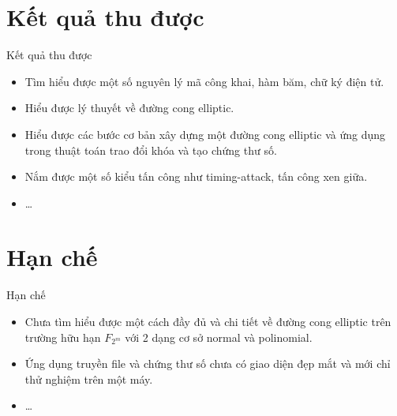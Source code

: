 \documentclass[compress]{beamer}
\begin{document}
\section*{Kết quả thu được}
\begin{frame}{Kết quả thu được}
\begin{itemize}
\item Tìm hiểu được một số nguyên lý mã công khai, hàm băm, chữ ký điện tử.
\item Hiểu được lý thuyết về đường cong elliptic.
\item Hiểu được các bước cơ bản xây dựng một đường cong elliptic và ứng dụng trong thuật toán trao đổi khóa và tạo chứng thư số.
\item Nắm được một số kiểu tấn công như timing-attack, tấn công xen giữa.
\item \ldots
\end{itemize}
\end{frame}
\section*{Hạn chế}
\begin{frame}{Hạn chế}
\begin{itemize}
\item Chưa tìm hiểu được một cách đầy đủ và chi tiết về đường cong elliptic trên trường hữu hạn $F_{2^m}$ với 2 dạng cơ sở normal và polinomial.
\item Ứng dụng truyền file và chứng thư số chưa có giao diện đẹp mắt và mới chỉ thử nghiệm trên một máy.
\item \ldots
\end{itemize}
\end{frame}
\end{document}
